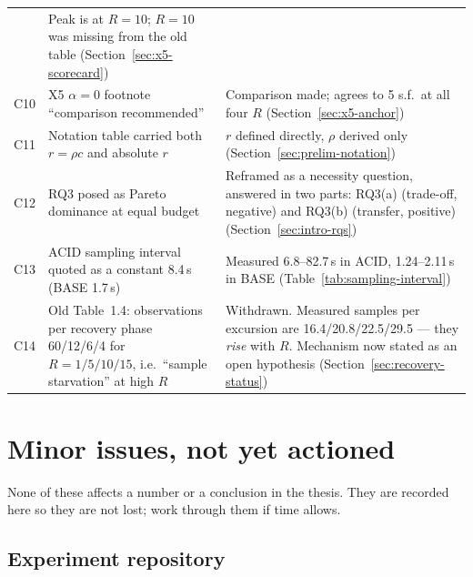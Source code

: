 \begin{table}[htbp]
\begin{tabular}{l p{4.4cm} p{5.2cm}}
   & Peak is at $R = 10$; $R = 10$ was missing from the old table
     (Section~\ref{sec:x5-scorecard}) \\
C10 & X5 $\alpha = 0$ footnote ``comparison recommended''
   & Comparison made; agrees to 5 s.f.\ at all four $R$
     (Section~\ref{sec:x5-anchor}) \\
C11 & Notation table carried both $r = \rho c$ and absolute $r$
   & $r$ defined directly, $\rho$ derived only
     (Section~\ref{sec:prelim-notation}) \\
C12 & RQ3 posed as Pareto dominance at equal budget
   & Reframed as a necessity question, answered in two parts:
     RQ3(a) (trade-off, negative) and RQ3(b) (transfer, positive)
     (Section~\ref{sec:intro-rqs}) \\
C13 & ACID sampling interval quoted as a constant 8.4\,s (BASE 1.7\,s)
   & Measured 6.8--82.7\,s in ACID, 1.24--2.11\,s in BASE
     (Table~\ref{tab:sampling-interval}) \\
C14 & Old Table~1.4: observations per recovery phase 60/12/6/4 for
     $R = 1/5/10/15$, i.e.\ ``sample starvation'' at high $R$
   & Withdrawn. Measured samples per excursion are 16.4/20.8/22.5/29.5 ---
     they \emph{rise} with $R$. Mechanism now stated as an open
     hypothesis (Section~\ref{sec:recovery-status}) \\
\bottomrule
\end{tabular}
\end{table}

\section{Minor issues, not yet actioned}\label{sec:reg-minor}

None of these affects a number or a conclusion in the thesis. They are
recorded here so they are not lost; work through them if time allows.

\subsection{Experiment repository}

